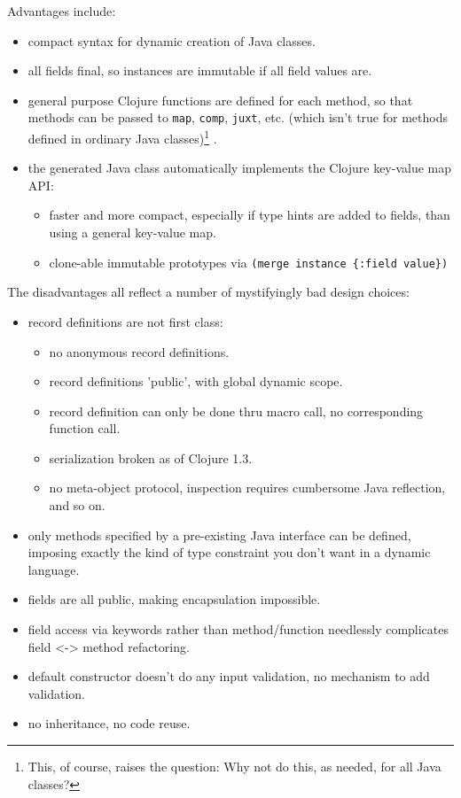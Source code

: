 \documentclass[11pt,openany,american,usenames,dvipsnames,svgnames,x11names,table,isodate]{article}
\numberwithin{equation}{section}
\numberwithin{figure}{section}
\begin{document}
Advantages include:
\begin{itemize}
\item compact syntax for dynamic creation of Java classes. 
\item all fields final, so instances are immutable if all field values are. 
\item general purpose Clojure functions are defined for each method, so
that methods can be passed to \texttt{map}, \texttt{comp}, \texttt{juxt},
etc. (which isn't true for methods defined in ordinary Java
classes)\footnote{This,  of course, raises the question: Why not do
this, as needed, for all Java classes?} .
\item the generated Java class automatically implements the Clojure key-value
map API:

\begin{itemize}
\item faster and more compact, especially if type hints are added to fields,
than using a general key-value map.
\item clone-able immutable prototypes via \texttt{(merge instance \{:field
value\})}
\end{itemize}
\end{itemize}
The disadvantages all reflect a number of mystifyingly bad design
choices:
\begin{itemize}
\item record definitions are not first class:

\begin{itemize}
\item no anonymous record definitions.
\item record definitions 'public', with global dynamic scope.
\item record definition can only be done thru macro call, no corresponding
function call.
\item serialization broken as of Clojure 1.3.
\item no meta-object protocol, inspection requires cumbersome Java reflection,
and so on.
\end{itemize}
\item only methods specified by a pre-existing Java interface can be defined,
imposing exactly the kind of type constraint you don't want in a dynamic
language.
\item fields are all public, making encapsulation impossible. 
\item field access via keywords rather than method/function needlessly complicates
field <-> method refactoring.
\item default constructor doesn't do any input validation, no mechanism
to add validation.
\item no inheritance, no code reuse.\end{itemize}
\end{document}
